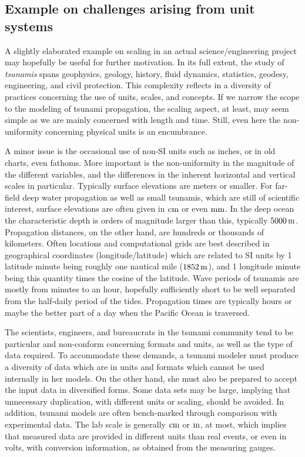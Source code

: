 \documentclass[graybox,envcountchap,sectrefs,final]{svmonodo}
\begin{document}
\subsection{Example on challenges arising from unit systems}

A slightly elaborated example on scaling in an actual
science/engineering project may hopefully be useful for further
motivation.  In its full extent, the study of \emph{tsunamis} spans
geophysics, geology, history, fluid dynamics, statistics, geodesy,
engineering, and civil protection. This complexity reflects in a
diversity of practices concerning the use of units, scales, and
concepts. If we narrow the scope to the modeling of tsunami
propagation, the scaling aspect, at least, may seem simple as we are
mainly concerned with length and time.  Still, even here the
non-uniformity concerning physical units is an encumbrance.

A minor issue is the occasional use of non-SI units such as inches, or
in old charts, even fathoms.  More important is the non-uniformity in
the magnitude of the different variables, and the differences in the
inherent horizontal and vertical scales in particular.  Typically
surface elevations are meters or smaller. For far-field deep water
propagation as well as small tsunamis, which are still of scientific
interest, surface elevations are often given in $\hbox{cm}$ or even
$\hbox{mm}$.  In the deep ocean the characteristic depth is orders of
magnitude larger than this, typically $5000\,\hbox{m}$. Propagation
distances, on the other hand, are hundreds or thousands of
kilometers. Often locations and computational grids are best described
in geographical coordinates (longitude/latitude) which are related to
SI units by 1 latitude minute being roughly one nautical mile
($1852\,\hbox{m}$), and 1 longitude minute being this quantity times
the cosine of the latitude. Wave periods of tsunamis are mostly from
minutes to an hour, hopefully sufficiently short to be well separated
from the half-daily period of the tides. Propagation times are
typically hours or maybe the better part of a day when the Pacific
Ocean is traversed.

The scientists, engineers, and bureaucrats in the tsunami community
tend to be particular and non-conform concerning formats and units, as
well as the type of data required.  To accommodate these demands, a
tsunami modeler must produce a diversity of data which are in units
and formats which cannot be used internally in her models.  On the
other hand, she must also be prepared to accept the input data in
diversified forms.  Some data sets may be large, implying that
unnecessary duplication, with different units or scaling, should be
avoided.  In addition, tsunami models are often bench-marked through
comparison with experimental data. The lab scale is generally
$\hbox{cm}$ or $\hbox{m}$, at most, which implies that measured data
are provided in different units than real events, or even in volts,
with conversion information, as obtained from the measuring gauges.
\end{document}
